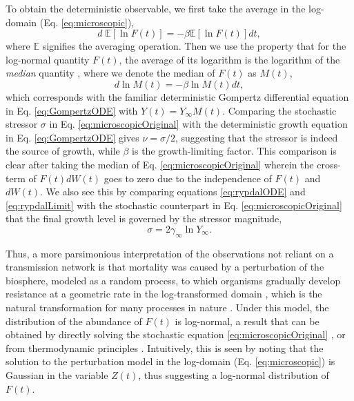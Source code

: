 \documentclass{article}
\begin{document}
To obtain the deterministic observable, we first take the average in the log-domain (Eq. \ref{eq:microscopic}), 
\begin{equation}
d \;\mathbb E[\ln{F(t)}] = -\beta \mathbb E[\ln{F(t)}] dt,
\end{equation}
where $\mathbb E$ signifies the averaging operation.
Then we use the property that for the log-normal quantity $F(t)$, the average of its logarithm is the logarithm of the \emph{median} quantity \cite{petroni2020gompertz}, where we denote the median of $F(t)$ as $M(t)$, 
\begin{equation}
\label{eq:medianGomp}
d\ln{M(t)} = -\beta \ln{M(t)} dt,
\end{equation}
which corresponds with the familiar deterministic Gompertz differential equation in Eq. \ref{eq:GompertzODE} with $Y(t) = Y_\infty M(t)$. 
Comparing the stochastic stressor $\sigma$ in Eq. \ref{eq:microscopicOriginal} with the deterministic growth equation in Eq. \ref{eq:GompertzODE} gives $\nu=\sigma/2$, suggesting that the stressor is indeed the source of growth, while $\beta$ is the growth-limiting factor. This comparison is clear after taking the median of Eq. \ref{eq:microscopicOriginal} wherein the cross-term of $F(t)dW(t)$ goes to zero due to the independence of $F(t)$ and $dW(t)$.
We also see this by comparing equations \ref{eq:rypdalODE} and \ref{eq:rypdalLimit} with the stochastic counterpart in Eq. \ref{eq:microscopicOriginal} that the final growth level is governed by the stressor magnitude,
\begin{equation}
\sigma = 2\gamma_{\infty}\ln{Y_{\infty}}.
\end{equation}

Thus, a more parsimonious interpretation of the observations not reliant on a transmission network is that mortality was caused by a perturbation of the biosphere, modeled as a random process, to which organisms gradually develop resistance at a geometric rate in the log-transformed domain \cite{boxenbaum2017hypotheses,neafsey1988gompertz}, which is the natural transformation for many processes in nature \cite{zhang1994log}. 
Under this model, the distribution of the abundance of $F(t)$ is log-normal, a result that can be obtained by directly solving the stochastic equation \ref{eq:microscopicOriginal} \cite{skiadas2010exact,petroni2020gompertz}, or from thermodynamic principles \cite{sitaram1984statistical,gunasekaran1982lon,chakrabarti1996non}. 
Intuitively, this is seen by noting that the solution to the perturbation model in the log-domain (Eq. \ref{eq:microscopic}) is Gaussian in the variable $Z(t)$, thus suggesting a log-normal distribution of $F(t)$.
\end{document}
